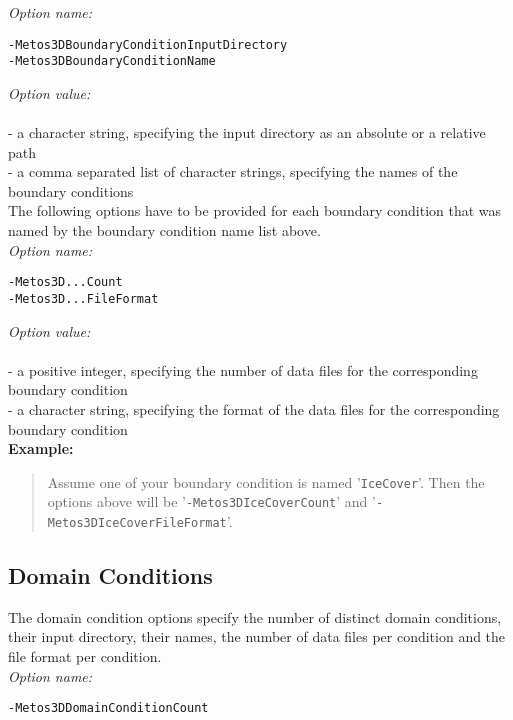 \documentclass{article}
\begin{document}
\emph{Option name:}
\begin{verbatim}
-Metos3DBoundaryConditionInputDirectory
-Metos3DBoundaryConditionName
\end{verbatim}

\emph{Option value:} \\
\vspace{-0.3cm}\\
- a character string, specifying the input directory as an absolute or a relative path \\
- a comma separated list of character strings, specifying the names of the boundary conditions \\

The following options have to be provided for each boundary condition
that was named by the boundary condition name list above. \\

\emph{Option name:}
\begin{verbatim}
-Metos3D...Count
-Metos3D...FileFormat
\end{verbatim}

\emph{Option value:} \\
\vspace{-0.3cm}\\
- a positive integer, specifying the number of data files for the corresponding boundary condition \\
- a character string, specifying the format of the data files for the corresponding boundary condition \\

\textbf{Example:}
\begin{quote}
Assume one of your boundary condition is named '\texttt{IceCover}'. Then the options
above will be '\texttt{-Metos3DIceCoverCount}' and '\texttt{-Metos3DIceCoverFileFormat}'.
\end{quote}

%
%
\subsection{Domain Conditions}

The domain condition options specify the number of distinct domain conditions,
their input directory, their names, the number of data files per condition
and the file format per condition. \\

\emph{Option name:}
\begin{verbatim}
-Metos3DDomainConditionCount
\end{verbatim}
\end{document}
